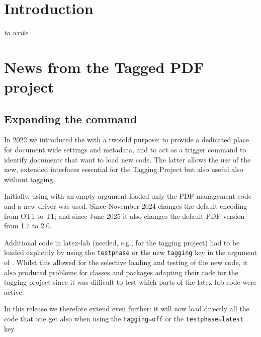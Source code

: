 \documentclass{ltnews}
\begin{document}
\maketitle
{  \spaceskip=3.33pt 
\tableofcontents}

\setlength{}

\medskip

\section{Introduction}

\emph{to write}


\section{News from the Tagged PDF project}

\subsection{Expanding the  command}

In 2022 we introduced the  with a twofold purpose:
to provide a dedicated place for document wide settings and metadata,
and to act as a trigger command to identify documents that want to load new code.
The latter allows the use of the new, extended interfaces essential for the Tagging Project
but also useful also without tagging.

Initially, using  with an empty argument loaded only the
PDF management code and a new  driver was used.
Since November 2024  changes the default encoding from OT1 to
 T1; and since June 2025 it also changes the default PDF version from 1.7 to 2.0.

Additional code in latex-lab (needed, e.g., for the tagging project) had to be loaded
explicitly by using the \texttt{testphase} or the new \texttt{tagging} key in
the argument of . Whilst this allowed for the selective loading and
testing of the new code, it also produced problems for classes and packages adapting
their code for the tagging project
since it was difficult to test which parts of the latex-lab code were active.

In this release we therefore extend  even further: it
will now load directly all the code that one get also when using the \texttt{tagging=off} or
the \texttt{testphase=latest} key.
\end{document}
